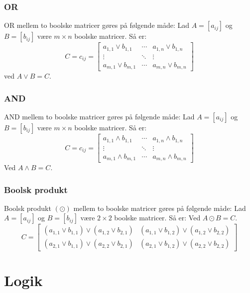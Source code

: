 \documentclass[a4paper]{article}
\begin{document}
    \subsubsection{OR}
      OR mellem to boolske matricer gøres på følgende måde:
      Lad $A = [a_{ij}]$ og $B= [b_{ij}]$ være $m \times n$ boolske matricer. Så er:
      $$
        C = c_{ij} = \begin{bmatrix}
                    a_{1,1} \vee b_{1,1} & \cdots & a_{1,n} \vee b_{1,n} \\
                    \vdots               & \ddots & \vdots \\
                    a_{m,1} \vee b_{m,1} & \cdots & a_{m,n} \vee b_{m,n}
                  \end{bmatrix}
      $$
      ved $A \vee B = C$.
    \subsubsection{AND}
      AND mellem to boolske matricer gøres på følgende måde:
      Lad $A = [a_{ij}]$ og $B= [b_{ij}]$ være $m \times n$ boolske matricer. Så er:
      $$
        C = c_{ij} = \begin{bmatrix}
                    a_{1,1} \wedge b_{1,1} & \cdots & a_{1,n} \wedge b_{1,n} \\
                    \vdots               & \ddots & \vdots \\
                    a_{m,1} \wedge b_{m,1} & \cdots & a_{m,n} \wedge b_{m,n}
                  \end{bmatrix}
      $$
      Ved $A \wedge B = C$.
    \subsubsection{Boolsk produkt} %
      Boolsk produkt $(\odot)$ mellem to boolske matricer gøres på følgende måde:
      Lad $A = [a_{ij}]$ og $B= [b_{ij}]$ være $2 \times 2$ boolske matricer. Så er:
      Ved $A \odot B = C$.
      $$
      C = \begin{bmatrix}
            (a_{1,1} \vee b_{1,1}) \vee (a_{1,2} \vee b_{2,1}) & (a_{1,1} \vee b_{1,2}) \vee (a_{1,2} \vee b_{2,2}) \\
            (a_{2,1} \vee b_{1,1}) \vee (a_{2,2} \vee b_{2,1}) & (a_{2,1} \vee b_{1,2}) \vee (a_{2,2} \vee b_{2,2})
      \end{bmatrix}
      $$


\section{Logik}
\end{document}
